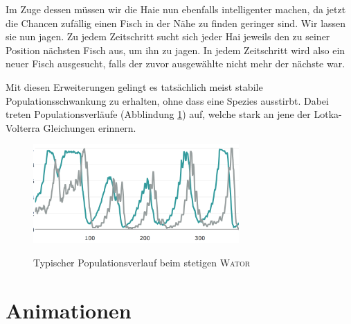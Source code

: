 \documentclass[a4paper,11pt]{article}
\newcommand{\wator}{\textsc{Wator }}
\theoremstyle{definition}
\numberwithin{equation}{section}
\begin{document}
	Im Zuge dessen müssen wir die Haie nun ebenfalls intelligenter machen, da jetzt die Chancen zufällig einen Fisch in der Nähe zu finden geringer sind. Wir lassen sie nun jagen. Zu jedem Zeitschritt sucht sich jeder Hai jeweils den zu seiner Position nächsten Fisch aus, um ihn zu jagen. In jedem Zeitschritt wird also ein neuer Fisch ausgesucht, falls der zuvor ausgewählte nicht mehr der nächste war.\newline
	
	Mit diesen Erweiterungen gelingt es tatsächlich meist stabile Populationsschwankung zu erhalten, ohne dass eine Spezies ausstirbt.
	Dabei treten Populationsverläufe (Abblindung \ref{fig:continuous_diagram}) auf, welche stark an jene der Lotka-Volterra Gleichungen erinnern.
	
	\begin{figure}
	\centering
	\includegraphics[width=0.7\textwidth]{pictures/continuous_diagram.png}
		\label{fig:continuous_diagram}
		\caption{Typischer Populationsverlauf beim stetigen \wator}
	\end{figure}

	\section{Animationen}
	
	\listoffigures
	


	\nocite{*}
	
\end{document}
